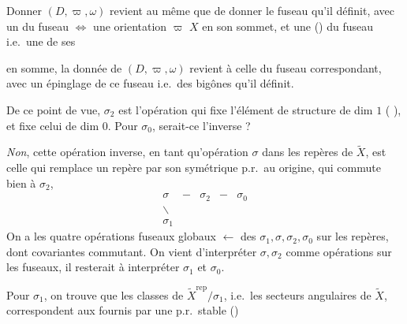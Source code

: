 \documentclass[11pt,a4paper]{article}
\begin{document}
Donner $(D, \varpi, \omega)$ revient au même que de donner le fuseau qu'il définit, avec un \struck{\ill{}} \ill{} du fuseau $\Longleftrightarrow$ une orientation $\varpi$  $X$ en son sommet, et une  () du fuseau i.e.\ une de ses \ill{}


\struck{\ill{}} %
en somme, la donnée de $(D, \varpi, \omega)$ revient à celle du fuseau correspondant, avec un épinglage de ce fuseau i.e.\ des bigônes qu'il définit.

De ce point de vue, $\sigma_2$ est l'opération qui fixe \struck{\ill{}} l'élément de structure  de dim $1$ (\ill{} \ill{}), et fixe celui de dim $0$. Pour $\sigma_0$, serait-ce l'inverse ?

\emph{Non}, cette opération inverse,  en tant qu'opération $\sigma$ dans les repères de $\widetilde{X}$, est celle qui remplace un repère par son symétrique p.r.\ au  \struck{\ill{}} origine, qui commute bien à $\sigma_2$,
\[
\begin{array}{ccccc}
\sigma & - & \sigma_2 & - & \sigma_0 \\
\backslash & & & & \\
\sigma_1 & & & &
\end{array}
\]
On a les quatre opérations  fuseaux globaux $\leftarrow$ des $\sigma_1, \sigma, \sigma_2, \sigma_0$ sur les repères, dont  covariantes commutant. On vient d'interpréter $\sigma, \sigma_2$ comme opérations sur les fuseaux, il resterait à interpréter $\sigma_1$ et $\sigma_0$.

Pour $\sigma_1$, on trouve que les classes de $\widetilde{X}^{\mathrm{rep}}/\sigma_1$, i.e.\ les secteurs angulaires de $\widetilde{X}$, correspondent aux  fournis par une p.r.\ stable (\ill{})
\end{document}
